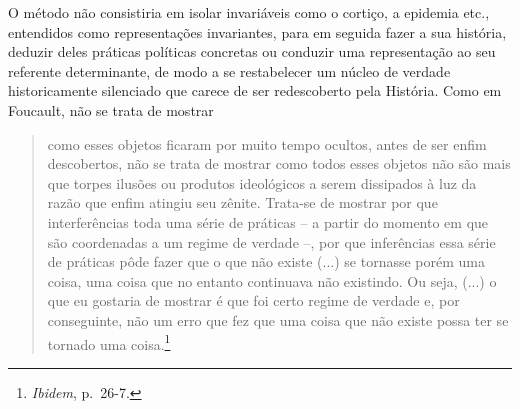 O método não consistiria em isolar invariáveis como o cortiço, a
epidemia etc., entendidos como representações invariantes, para em
seguida fazer a sua história, deduzir deles práticas políticas concretas
ou conduzir uma representação ao seu referente determinante, de modo a
se restabelecer um núcleo de verdade historicamente silenciado que
carece de ser redescoberto pela História. Como em Foucault, não se trata
de mostrar

\begin{quote}
como esses objetos ficaram por muito tempo ocultos, antes de ser enfim
descobertos, não se trata de mostrar como todos esses objetos não são
mais que torpes ilusões ou produtos ideológicos a serem dissipados à luz
da razão que enfim atingiu seu zênite. Trata-se de mostrar por que
interferências toda uma série de práticas -- a partir do momento em que
são coordenadas a um regime de verdade --, por que inferências essa
série de práticas pôde fazer que o que não existe (...) se tornasse
porém uma coisa, uma coisa que no entanto continuava não existindo. Ou
seja, (...) o que eu gostaria de mostrar é que foi certo regime de
verdade e, por conseguinte, não um erro que fez que uma coisa que não
existe possa ter se tornado uma coisa.\footnote{\emph{Ibidem}, p.~26-7.}
\end{quote}

